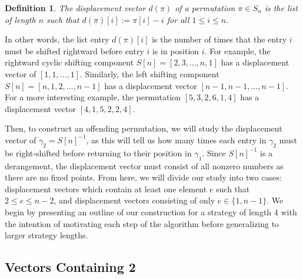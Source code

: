 \documentclass[article]{amsart}
\theoremstyle{plain}
\newtheorem{definition}[theorem]{Definition}
\begin{document}
\begin{definition} \label{def:disp}
The displacement vector $d(\pi)$ of a permutation $\pi \in S_n$ is the list of length $n$ such that $d(\pi)[i] := \pi[i] - i $ for all $1 \leq i \leq n$.    
\end{definition}

In other words, the list entry $d(\pi)[i]$ is the number of times that the entry $i$ must be shifted rightward before entry $i$ is in position $i$. 
For example, the rightward cyclic shifting component $S[n] = [2,3, \dots, n,1]$ has a displacement vector of $[1,1,\dots,1]$. Similarly, the left shifting component $S[n] = [n, 1,2, \dots, n-1]$ has a displacement vector $[n-1,n-1,\dots,n-1]$. For a more interesting example, the permutation $[5,3,2,6,1,4]$ has a displacement vector $[4,1,5,2,2,4]$. 

Then, to construct an offending permutation, we will study the displacement vector of $\gamma_2 = S[n]^{-1}$, as this will tell us how many times each entry in $\gamma_2$ must be right-shifted before returning to their position in $\gamma_1$. Since $S[n]^{-1}$ is a derangement, the displacement vector must consist of all nonzero numbers as there are no fixed points. From here, we will divide our study into two cases: displacement vectors which contain at least one element $e$ such that $2 \leq e \leq n-2$, and displacement vectors consisting of only $e \in \{1,n-1\}$. %
We begin by presenting an outline of our construction for a strategy of length 4 with the intention of motivating each step of the algorithm before generalizing to larger strategy lengths. 


\subsection{Vectors Containing 2} \label{sub:2s}
\end{document}
